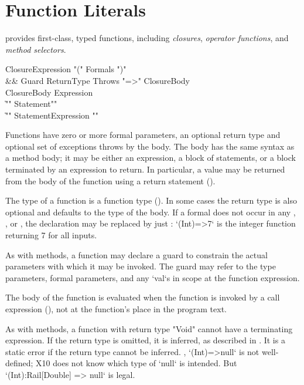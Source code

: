 \section{Function Literals}
\label{FunctionLiteral}

\Xten{} provides first-class, typed functions, including
\emph{closures}, \emph{operator functions}, and \emph{method
  selectors}.

\begin{grammar}
ClosureExpression \:
        \xcd"("
        Formals\opt
        \xcd")"
\\ &&
        Guard\opt
        ReturnType\opt
        Throws\opt
        \xcd"=>" ClosureBody \\
ClosureBody \:
        Expression \\
        \| \xcd"{" Statement\star \xcd"}" \\
        \| \xcd"{" Statement\star Expression \xcd"}" \\
\end{grammar}

Functions have zero or more formal parameters, an optional return type
and optional set of exceptions throws by the body.  The body has the
same syntax as a method body; it may be either an expression, a block
of statements, or a block terminated by an expression to return. In
particular, a value may be returned from the body of the function
using a return statement (). 

The type of a
function is a function type ().  In some cases the
return type  is also optional and defaults to the type of the
body. If a formal  does not occur in any
, ,  or , the declaration  may
be replaced by just : \xcd`(Int)=>7` is the integer function returning
7 for all inputs.

\label{ClosureGuard}

As with methods, a function may declare a guard to
constrain the actual parameters with which it may be invoked.
The guard may refer to the type parameters, formal parameters,
and any \xcd`val`s in scope at the function expression.

The body of the function is evaluated when the function is
invoked by a call expression (), not at the function's
place in the program text.

As with methods, a function with return type \xcd"Void" cannot
have a terminating expression. 
If the return type is omitted, it is inferred, as described in
.
It is a static error if the return type cannot be inferred.  \Eg,
\xcd`(Int)=>null` is not well-defined; X10 does not know which type of
\xcd`null` is intended.  
But \xcd`(Int):Rail[Double] => null` is legal.


